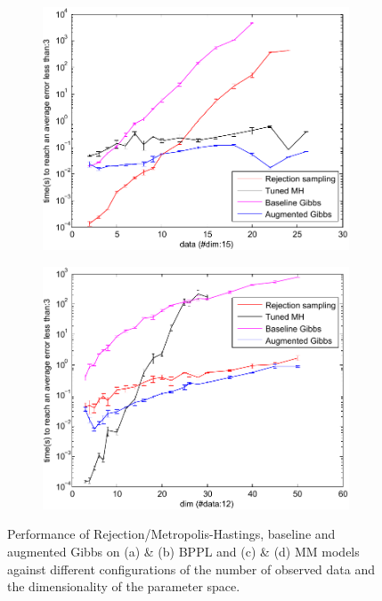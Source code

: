 \begin{figure} 
\centering
\begin{subfigure}{.45\textwidth}
  \centering
  \includegraphics[width=1.00\textwidth]{plot/bppl_data_analysis_fit.pdf}
  \caption{}
  \label{fig:error-samples-bppl}
\end{subfigure}
\begin{subfigure}{.45\textwidth}
  \centering
  \includegraphics[width=1.00\textwidth]{plot/bppl_dim_analysis_fit.pdf}
  \caption{}
  \label{fig:error-samples-bppl}
\end{subfigure}
\caption{Performance of Rejection/Metropolis-Hastings, baseline and augmented Gibbs on (a) \& (b) BPPL and (c) \& (d) MM models against different configurations of the number of observed data and the dimensionality of the parameter space.}
\label{fig:results1}
\end{figure}
